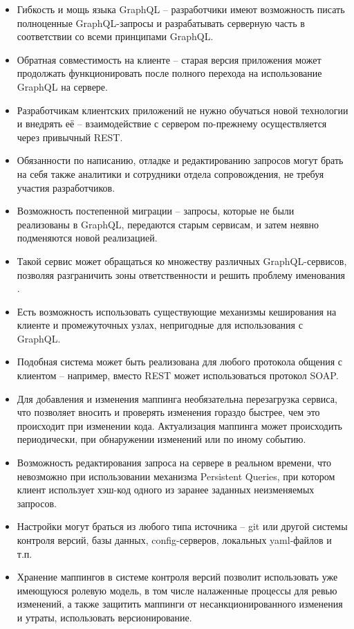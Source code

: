 \begin{itemize}
    \item Гибкость и мощь языка GraphQL – разработчики имеют возможность писать полноценные GraphQL-запросы и разрабатывать серверную часть в соответствии со всеми принципами GraphQL\@.
    \item Обратная совместимость на клиенте – старая версия приложения может продолжать функционировать после полного перехода на использование GraphQL на сервере.
    \item Разработчикам клиентских приложений не нужно обучаться новой технологии и внедрять её – взаимодействие с сервером по-прежнему осуществляется через привычный REST\@.
    \item Обязанности по написанию, отладке и редактированию запросов могут брать на себя также аналитики и сотрудники отдела сопровождения, не требуя участия разработчиков.
    \item Возможность постепенной миграции – запросы, которые не были реализованы в GraphQL, передаются старым сервисам, и затем неявно подменяются новой реализацией.
    \item Такой сервис может обращаться ко множеству различных GraphQL-сервисов, позволяя разграничить зоны ответственности и решить проблему именования \cite{graphql-disadvantage-namespaces}.
    \item Есть возможность использовать существующие механизмы кеширования на клиенте и промежуточных узлах, непригодные для использования с GraphQL\@.
    \item Подобная система может быть реализована для любого протокола общения с клиентом – например, вместо REST может использоваться протокол SOAP\@.
    \item Для добавления и изменения маппинга необязательна перезагрузка сервиса, что позволяет вносить и проверять изменения гораздо быстрее, чем это происходит при изменении кода.
    Актуализация маппинга может происходить периодически, при обнаружении изменений или по иному событию.
    \item Возможность редактирования запроса на сервере в реальном времени, что невозможно при использовании механизма Persistent Queries, при котором клиент использует хэш-код одного из заранее заданных неизменяемых запросов.
    \item Настройки могут браться из любого типа источника – git или другой системы контроля версий, базы данных, config-серверов, локальных yaml-файлов и т.п.
    \item Хранение маппингов в системе контроля версий позволит использовать уже имеющуюся ролевую модель, в том числе налаженные процессы для ревью изменений, а также защитить маппинги от несанкционированного изменения и утраты, использовать версионирование.

\end{itemize}
